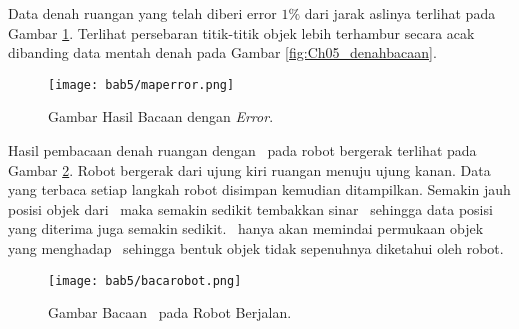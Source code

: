 Data denah ruangan yang telah diberi error $1\%$ dari jarak aslinya terlihat pada Gambar \ref*{fig:Ch05_denaherror}. Terlihat persebaran titik-titik objek lebih terhambur secara acak dibanding data mentah denah pada Gambar \ref*{fig:Ch05_denahbacaan}.
\begin{figure}[H]
    \centering
    \texttt{[image: bab5/maperror.png]}
    \caption{Gambar Hasil Bacaan dengan \textit{Error}.}
        \label{fig:Ch05_denaherror}
\end{figure}
Hasil pembacaan denah ruangan dengan \lidar\ pada robot bergerak terlihat pada Gambar \ref*{fig:Ch05_bacarobot}. Robot bergerak dari ujung kiri ruangan menuju ujung kanan. Data yang terbaca setiap langkah robot disimpan kemudian ditampilkan. Semakin jauh posisi objek dari \lidar\ maka semakin sedikit tembakkan sinar \lidar\ sehingga data posisi yang diterima juga semakin sedikit. \lidar\ hanya akan memindai permukaan objek yang menghadap \lidar\ sehingga bentuk objek tidak sepenuhnya diketahui oleh robot.
\begin{figure}[H]
    \centering
    \texttt{[image: bab5/bacarobot.png]}
    \caption{Gambar Bacaan \lidar\ pada Robot Berjalan.}
        \label{fig:Ch05_bacarobot}
\end{figure}


